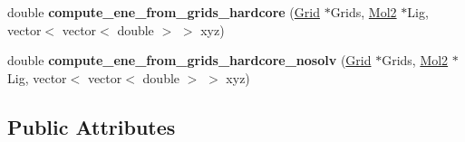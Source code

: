 \begin{DoxyCompactItemize}
\item 
\hypertarget{classENERGY_a198df6d975e929181b5fcb3cd8fe14c8}{
double {\bfseries compute\_\-ene\_\-from\_\-grids\_\-hardcore} (\hyperlink{classGrid}{Grid} $\ast$Grids, \hyperlink{classMol2}{Mol2} $\ast$Lig, vector$<$ vector$<$ double $>$ $>$ xyz)}
\label{classENERGY_a198df6d975e929181b5fcb3cd8fe14c8}

\item 
\hypertarget{classENERGY_ac3c727288f8732f511bc690a3d3fb530}{
double {\bfseries compute\_\-ene\_\-from\_\-grids\_\-hardcore\_\-nosolv} (\hyperlink{classGrid}{Grid} $\ast$Grids, \hyperlink{classMol2}{Mol2} $\ast$Lig, vector$<$ vector$<$ double $>$ $>$ xyz)}
\label{classENERGY_ac3c727288f8732f511bc690a3d3fb530}

\end{DoxyCompactItemize}
\subsection*{Public Attributes}
